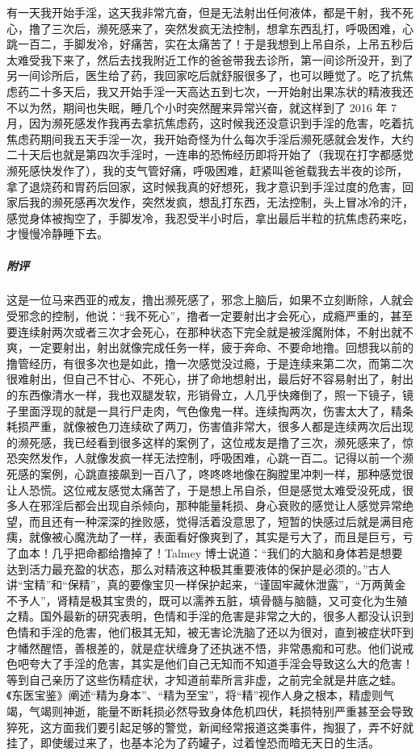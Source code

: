\begin{case}
    有一天我开始手淫，这天我非常亢奋，但是无法射出任何液体，都是干射，我不死心，撸了三次后，濒死感来了，突然发疯无法控制，想拿东西乱打，呼吸困难，心跳一百二，手脚发冷，好痛苦，实在太痛苦了！于是我想到上吊自杀，上吊五秒后太难受我下来了，然后去找我附近工作的爸爸带我去诊所，第一间诊所没开，到了另一间诊所后，医生给了药，我回家吃后就舒服很多了，也可以睡觉了。吃了抗焦虑药二十多天后，我又开始手淫一天高达五到七次，一开始射出果冻状的精液我还不以为然，期间也失眠，睡几个小时突然醒来异常兴奋，就这样到了 2016 年 7 月，因为濒死感发作我再去拿抗焦虑药，这时候我还没意识到手淫的危害，吃着抗焦虑药期间我五天手淫一次，我开始奇怪为什么每次手淫后濒死感就会发作，大约二十天后也就是第四次手淫时，一连串的恐怖经历即将开始了（我现在打字都感觉濒死感快发作了），我的支气管好痛，呼吸困难，赶紧叫爸爸载我去半夜的诊所，拿了退烧药和胃药后回家，这时候我真的好想死，我才意识到手淫过度的危害，回家后我的濒死感再次发作，突然发疯，想乱打东西，无法控制，头上冒冰冷的汗，感觉身体被掏空了，手脚发冷，我忍受半小时后，拿出最后半粒的抗焦虑药来吃，才慢慢冷静睡下去。
    \subparagraph{附评} 这是一位马来西亚的戒友，撸出濒死感了，邪念上脑后，如果不立刻断除，人就会受邪念的控制，他说：“我不死心”，撸者一定要射出才会死心，成瘾严重的，甚至要连续射两次或者三次才会死心，在那种状态下完全就是被淫魔附体，不射出就不爽，一定要射出，射出就像完成任务一样，疲于奔命、不要命地撸。回想我以前的撸管经历，有很多次也是如此，撸一次感觉没过瘾，于是连续来第二次，而第二次很难射出，但自己不甘心、不死心，拼了命地想射出，最后好不容易射出了，射出的东西像清水一样，我也双腿发软，形销骨立，人几乎快瘫倒了，照一下镜子，镜子里面浮现的就是一具行尸走肉，气色像鬼一样。连续掏两次，伤害太大了，精条耗损严重，就像被色刀连续砍了两刀，伤害值非常大，很多人都是连续两次后出现的濒死感，我已经看到很多这样的案例了，这位戒友是撸了三次，濒死感来了，惊恐突然发作，人就像发疯一样无法控制，呼吸困难，心跳一百二。记得以前一个濒死感的案例，心跳直接飙到一百八了，咚咚咚地像在胸膛里冲刺一样，那种感觉很让人恐慌。这位戒友感觉太痛苦了，于是想上吊自杀，但是感觉太难受没死成，很多人在邪淫后都会出现自杀倾向，那种能量耗损、身心衰败的感觉让人感觉异常绝望，而且还有一种深深的挫败感，觉得活着没意思了，短暂的快感过后就是满目疮痍，就像被心魔洗劫了一样，表面看好像爽到了，其实是亏大了，而且是巨亏，亏了血本！几乎把命都给撸掉了！Talmey 博士说道：“我们的大脑和身体若是想要达到活力最充盈的状态，那么对精液这种极其重要液体的保护是必须的。”古人讲“宝精”和“保精”，真的要像宝贝一样保护起来，“谨固牢藏休泄露”，“万两黄金不予人”，肾精是极其宝贵的，既可以濡养五脏，填骨髓与脑髓，又可变化为生殖之精。国外最新的研究表明，色情和手淫的危害是非常之大的，很多人都没认识到色情和手淫的危害，他们极其无知，被无害论洗脑了还以为很对，直到被症状吓到才幡然醒悟，善根差的，就是症状缠身了还执迷不悟，非常愚痴和可悲。他们说戒色吧夸大了手淫的危害，其实是他们自己无知而不知道手淫会导致这么大的危害！等到自己亲历了这些伤精症状，才知道前辈所言非虚，之前完全就是井底之蛙。《东医宝鉴》阐述“精为身本”、“精为至宝”，将“精”视作人身之根本，精虚则气竭，气竭则神逝，能量不断耗损必然导致身体危机四伏，耗损特别严重甚至会导致猝死，这方面我们要引起足够的警觉，新闻经常报道这类事件，掏狠了，弄不好就挂了，即使缓过来了，也基本沦为了药罐子，过着惶恐而暗无天日的生活。
\end{case}

